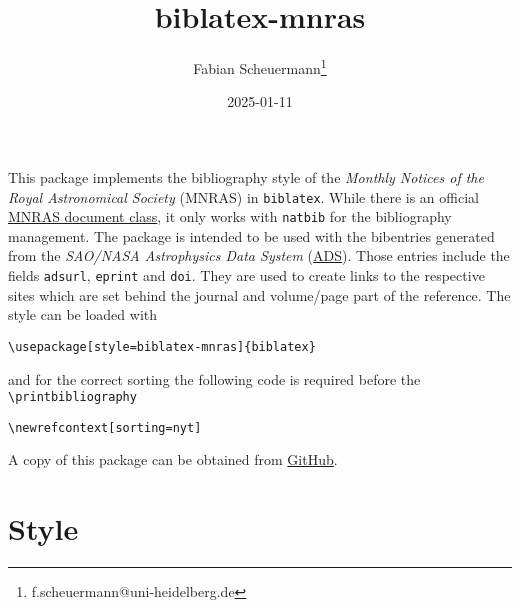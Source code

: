 \documentclass{scrartcl}
\title{biblatex-mnras}
\author{Fabian Scheuermann\thanks{f.scheuermann@uni-heidelberg.de}}
\date{2025-01-11}
\begin{document}
\maketitle

This package implements the bibliography style of the \emph{Monthly Notices of the Royal Astronomical Society} (MNRAS) in \texttt{biblatex}. 
While there is an official \href{https://www.ctan.org/tex-archive/macros/latex/contrib/mnras}{MNRAS document class}, it only works with \texttt{natbib} for the bibliography management. 
The package is intended to be used with the bibentries generated from the \textit{SAO/NASA Astrophysics Data System} (\href{https://ui.adsabs.harvard.edu/}{ADS}). Those entries include the fields \texttt{adsurl}, \texttt{eprint} and \texttt{doi}. They are used to create links to the respective sites which are set behind the journal and volume/page part of the reference. The style can be loaded with
\begin{verbatim}
\usepackage[style=biblatex-mnras]{biblatex}
\end{verbatim}
and for the correct sorting the following code is required before the \verb|\printbibliography|
\begin{verbatim}
\newrefcontext[sorting=nyt]
\end{verbatim}
A copy of this package can be obtained from \href{https://github.com/fschmnn/biblatex-mnras}{GitHub}.

\section*{Style}
\end{document}
